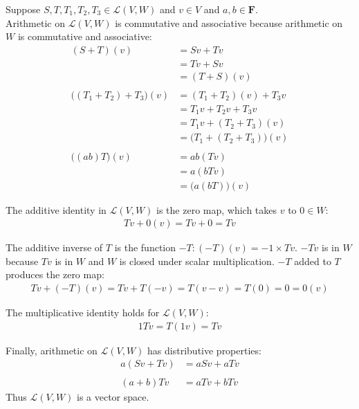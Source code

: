 \documentclass[a5paper]{article}
\begin{document}
\newcommand   \F { \mathbf{F}  }
\renewcommand \L { \mathcal{L} }

Suppose $S,T,T_1,T_2,T_3 \in \L(V,W)$ and $v\in V$ and $a,b \in \F$. \\

Arithmetic on $\L(V,W)$ is commutative and associative because arithmetic on $W$ is commutative and associative:
\begin{align*}
             (S + T)(v) &= Sv + Tv \\
                        &= Tv + Sv \\
                        &= (T + S)(v) \\
  \\
    \big( (T_1 + T_2) + T_3 \big)(v) &= (T_1 + T_2)(v) + T_3v     \\
                                     &= T_1v + T_2v + T_3v      \\
                                     &= T_1v + (T_2 + T_3)(v)   \\
                                     &= \big( T_1 + (T_2 + T_3) \big)(v) \\
  \\
           \big( (ab)T \big)(v) &= ab(Tv)       \\
                                &= a(bTv)       \\
                                &= \big( a(bT) \big)(v)
\end{align*}

The additive identity in $\L(V,W)$ is the zero map, which takes $v$ to $0\in W$:
\begin{align*}
    Tv + 0(v) = Tv + 0 = Tv
\end{align*}

The additive inverse of $T$ is the function $-T : (-T)(v) = -1\times Tv$.
$-Tv$ is in $W$ because $Tv$ is in $W$ and $W$ is closed under scalar multiplication.
$-T$ added to $T$ produces the zero map:
\begin{align*}
    Tv + (-T)(v) = Tv + T(-v) = T(v - v) = T(0) = 0 = 0(v)
\end{align*}

The multiplicative identity holds for $\L(V,W)$:
\begin{align*}
    1Tv = T(1v) = Tv
\end{align*}

Finally, arithmetic on $\L(V,W)$ has distributive properties:
\begin{align*}
    a(Sv + Tv) &= aSv + aTv            \\
  \\
     (a + b)Tv &= aTv + bTv
\end{align*}
Thus $\L(V,W)$ is a vector space.
\end{document}
